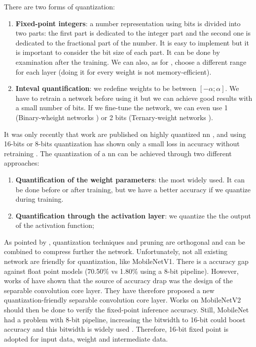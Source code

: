 There are two forms of quantization:
\begin{enumerate}
    \item \textbf{Fixed-point integers}: a number representation using bits is divided into two parts: the first part is dedicated to the integer part and the second one is dedicated to the fractional part of the number. It is easy to implement but it is important to consider the bit size of each part. It can be done by examination after the training. We can also, as for \cite{qiu_going_2016, yin_high_2018}, choose a different range for each layer (doing it for every weight is not memory-efficient).
    \item \textbf{Inteval quantification}: we redefine weights to be between $[-\alpha; \alpha]$. We have to retrain a network before using it but we can achieve good results with a small number of bits. If we fine-tune the network, we can even use 1 (Binary-wheight networks \cite{courbariaux_binarized_2016}) or 2 bits (Ternary-weight networks \cite{li_ternary_2016}).
\end{enumerate}
%
It was only recently that work are published on highly quantized \acrshort{nn} \cite{guo_survey_2018}, and using 16-bits or 8-bits quantization has shown only a small loss in accuracy without retraining \cite{abdelouahab_accelerating_2018}. The quantization of a \acrshort{nn} can be achieved through two different approaches:
\begin{enumerate}
    \item \textbf{Quantification of the weight parameters}: the most widely used. It can be done before or after training, but we have a better accuracy if we quantize during training.
    \item \textbf{Quantification through the activation layer}: we quantize the the output of the activation function;
\end{enumerate}
As pointed by \textcite{han_deep_2016}, quantization techniques and pruning are orthogonal and can be combined to compress further the network. Unfortunately, not all existing network are friendly for quantization, like MobileNetV1. There is a accuracy gap against float point models (70.50\% vs 1.80\% using a 8-bit pipeline). However, works of \textcite{sheng_quantization-friendly_2018} have shown that the source of accuracy drap was the design of the separable convolution core layer. They have therefore proposed a new quantization-friendly separable convolution core layer. Works on MobileNetV2 should then be done to verify the fixed-point inference accuracy. Still, MobileNet had a problem with 8-bit pipeline, increasing the bitwidth to 16-bit could boost accuracy \cite{cheng_recent_2018} and this bitwidth is widely used \cite{huimin_li_high_2016, bai_cnn_2018}. Therefore, 16-bit fixed point is adopted for input data, weight and intermediate data.
